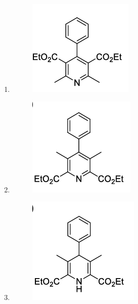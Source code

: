 \documentclass{article}
\begin{document}
\begin{enumerate}
\begin{multicols}{2}
    \begin{enumerate}
        \item \begin{figure}[H]
            \centering
            \includegraphics[width=0.4\columnwidth]{figures/cy_q2a.png}
            \label{fig:placeholder}
        \end{figure}

        \item \begin{figure}[H]
            \centering
            \includegraphics[width=0.4\columnwidth]{figures/cy_q2b.png}
            \label{fig:placeholder}
        \end{figure}

        \item \begin{figure}[H]
            \centering
            \includegraphics[width=0.4\columnwidth]{figures/cy_q2c.png}
            \label{fig:placeholder}
        \end{figure}


\end{enumerate}
\end{multicols}
\end{enumerate}
\end{document}
